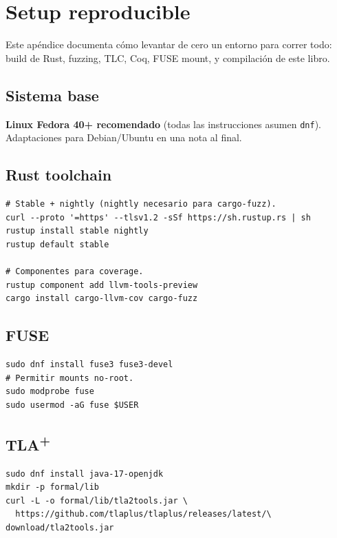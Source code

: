 \chapter{Setup reproducible}
\label{ap:setup}

Este apéndice documenta cómo levantar de cero un entorno para correr
todo: build de Rust, fuzzing, TLC, Coq, FUSE mount, y compilación de
este libro.

\section*{Sistema base}

\textbf{Linux Fedora 40+ recomendado} (todas las instrucciones asumen
\texttt{dnf}). Adaptaciones para Debian/Ubuntu en una nota al final.

\section*{Rust toolchain}

\begin{lstlisting}[language=shellcmd]
# Stable + nightly (nightly necesario para cargo-fuzz).
curl --proto '=https' --tlsv1.2 -sSf https://sh.rustup.rs | sh
rustup install stable nightly
rustup default stable

# Componentes para coverage.
rustup component add llvm-tools-preview
cargo install cargo-llvm-cov cargo-fuzz
\end{lstlisting}

\section*{FUSE}

\begin{lstlisting}[language=shellcmd]
sudo dnf install fuse3 fuse3-devel
# Permitir mounts no-root.
sudo modprobe fuse
sudo usermod -aG fuse $USER
\end{lstlisting}

\section*{TLA\textsuperscript{+}}

\begin{lstlisting}[language=shellcmd]
sudo dnf install java-17-openjdk
mkdir -p formal/lib
curl -L -o formal/lib/tla2tools.jar \
  https://github.com/tlaplus/tlaplus/releases/latest/\
download/tla2tools.jar
\end{lstlisting}

